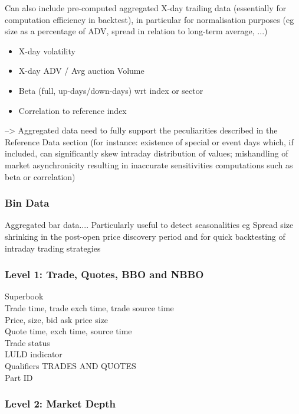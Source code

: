 Can also include pre-computed aggregated X-day trailing data (essentially for computation efficiency in backtest), in particular for normalisation purposes (eg size as a percentage of ADV, spread in relation to long-term average, ...)
\begin{itemize}

\item X-day volatility
\item X-day ADV / Avg auction Volume
\item Beta (full, up-days/down-days) wrt index or sector
\item Correlation to reference index
\end{itemize}

--> Aggregated data need to fully support the peculiarities described in the Reference Data section (for instance: existence of special or event days which, if included, can significantly skew intraday distribution of values; mishandling of market asynchronicity resulting in inaccurate sensitivities computations such as beta or correlation)

\subsubsection{Bin Data}

Aggregated bar data....
Particularly useful to detect seasonalities eg Spread size shrinking in the post-open price discovery period and for quick backtesting of intraday trading strategies

\subsubsection{Level 1: Trade, Quotes, BBO and NBBO}

Superbook \\
Trade time, trade exch time, trade source time \\
Price, size, bid ask price size \\
Quote time, exch time, source time \\
Trade status \\
LULD indicator \\
Qualifiers TRADES AND QUOTES \\
Part ID

\subsubsection{Level 2: Market Depth}



